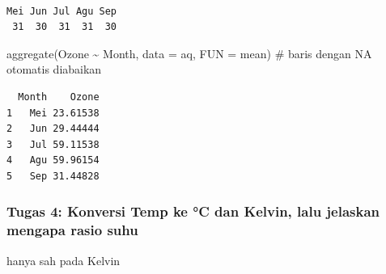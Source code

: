 \documentclass[
  indonesian,
  letterpaper,
]{book}
\newenvironment{Shaded}{\begin{snugshade}}{\end{snugshade}}
\newcommand{\AttributeTok}[1]{\textcolor[rgb]{0.40,0.45,0.13}{#1}}
\newcommand{\CommentTok}[1]{\textcolor[rgb]{0.37,0.37,0.37}{#1}}
\newcommand{\ConstantTok}[1]{\textcolor[rgb]{0.56,0.35,0.01}{#1}}
\newcommand{\DecValTok}[1]{\textcolor[rgb]{0.68,0.00,0.00}{#1}}
\newcommand{\FunctionTok}[1]{\textcolor[rgb]{0.28,0.35,0.67}{#1}}
\newcommand{\NormalTok}[1]{\textcolor[rgb]{0.00,0.23,0.31}{#1}}
\newcommand{\OtherTok}[1]{\textcolor[rgb]{0.00,0.23,0.31}{#1}}
\newcommand{\SpecialCharTok}[1]{\textcolor[rgb]{0.37,0.37,0.37}{#1}}
\newcommand{\StringTok}[1]{\textcolor[rgb]{0.13,0.47,0.30}{#1}}
\begin{document}
\begin{Shaded}
\end{Shaded}

\begin{verbatim}

Mei Jun Jul Agu Sep 
 31  30  31  31  30 
\end{verbatim}

\begin{Shaded}
\begin{Highlighting}[]
\FunctionTok{aggregate}\NormalTok{(Ozone }\SpecialCharTok{\textasciitilde{}}\NormalTok{ Month, }\AttributeTok{data =}\NormalTok{ aq, }\AttributeTok{FUN =}\NormalTok{ mean) }\CommentTok{\# baris dengan NA otomatis diabaikan}
\end{Highlighting}
\end{Shaded}

\begin{verbatim}
  Month    Ozone
1   Mei 23.61538
2   Jun 29.44444
3   Jul 59.11538
4   Agu 59.96154
5   Sep 31.44828
\end{verbatim}

\subsubsection{Tugas 4: Konversi Temp ke °C dan Kelvin, lalu jelaskan
mengapa rasio
suhu}\label{tugas-4-konversi-temp-ke-c-dan-kelvin-lalu-jelaskan-mengapa-rasio-suhu}

hanya sah pada Kelvin
\end{document}
